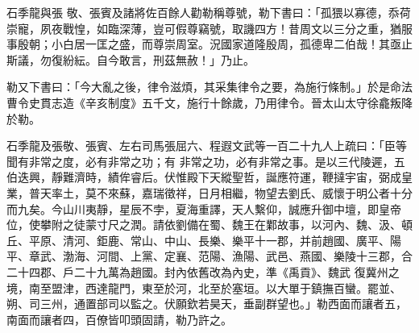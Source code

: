 \begin{pinyinscope}
 石季龍與張
 敬、張賓及諸將佐百餘人勸勒稱尊號，勒下書曰：「孤猥以寡德，忝荷崇寵，夙夜戰惶，如臨深薄，豈可假尊竊號，取譏四方！昔周文以三分之重，猶服事殷朝；小白居一匡之盛，而尊崇周室。況國家道隆殷周，孤德卑二伯哉！其亟止斯議，勿復紛紜。自今敢言，刑茲無赦！」乃止。



 勒又下書曰：「今大亂之後，律令滋煩，其采集律令之要，為施行條制。」於是命法曹令史貫志造《辛亥制度》五千文，施行十餘歲，乃用律令。晉太山太守徐龕叛降於勒。



 石季龍及張敬、張賓、左右司馬張屈六、程遐文武等一百二十九人上疏曰：「臣等聞有非常之度，必有非常之功；有
 非常之功，必有非常之事。是以三代陵遲，五伯迭興，靜難濟時，績侔睿后。伏惟殿下天縱聖哲，誕應符運，鞭撻宇宙，弼成皇業，普天率土，莫不來蘇，嘉瑞徵祥，日月相繼，物望去劉氏、威懷于明公者十分而九矣。今山川夷靜，星辰不孛，夏海重譯，天人繫仰，誠應升御中壇，即皇帝位，使攀附之徒蒙寸尺之潤。請依劉備在蜀、魏王在鄴故事，以河內、魏、汲、頓丘、平原、清河、鉅鹿、常山、中山、長樂、樂平十一郡，并前趙國、廣平、陽平、章武、渤海、河間、上黨、定襄、范陽、漁陽、武邑、燕國、樂陵十三郡，合二十四郡、戶二十九萬為趙國。封內依舊改為內史，準《禹貢》、魏武
 復冀州之境，南至盟津，西達龍門，東至於河，北至於塞垣。以大單于鎮撫百蠻。罷並、朔、司三州，通置部司以監之。伏願欽若昊天，垂副群望也。」勒西面而讓者五，南面而讓者四，百僚皆叩頭固請，勒乃許之。



\end{pinyinscope}